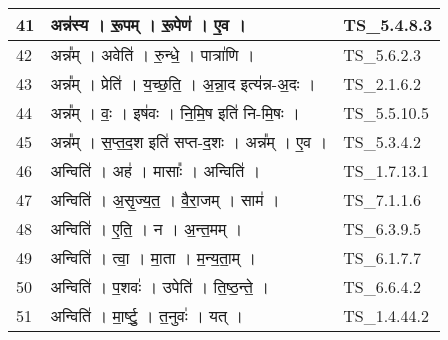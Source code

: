 \documentclass[17pt]{extarticle}
\begin{document}
\begin{longtable}{||p{0.4in}||p{4.9in}||p{0.9in}||}
    \hline
        
    41 & अन्न॑स्य   ।   रू॒पम्   ।   रू॒पेण॑   ।   ए॒व   ।    & TS\_5.4.8.3       \\
    
    \hline
        
    42 & अन्न᳚म्   ।   अवेति॑   ।   रु॒न्धे॒   ।   पात्रा॑णि   ।    & TS\_5.6.2.3       \\
    
    \hline
        
    43 & अन्न᳚म्   ।   प्रेति॑   ।   य॒च्छ॒ति॒   ।   अ॒न्ना॒द इत्य॑न्न{-}अ॒दः   ।    & TS\_2.1.6.2       \\
    
    \hline
        
    44 & अन्न᳚म्   ।   वः॒   ।   इष॑वः   ।   नि॒मि॒ष इति॑ नि{-}मि॒षः   ।    & TS\_5.5.10.5       \\
    
    \hline
        
    45 & अन्न᳚म्   ।   स॒प्त॒द॒श इति॑ सप्त{-}द॒शः   ।   अन्न᳚म्   ।   ए॒व   ।    & TS\_5.3.4.2       \\
    
    \hline
        
    46 & अन्विति॑   ।   अह॑   ।   मासाः᳚   ।   अन्विति॑   ।    & TS\_1.7.13.1       \\
    
    \hline
        
    47 & अन्विति॑   ।   अ॒सृ॒ज्य॒त॒   ।   वै॒रा॒जम्   ।   साम॑   ।    & TS\_7.1.1.6       \\
    
    \hline
        
    48 & अन्विति॑   ।   ए॒ति॒   ।   न   ।   अ॒न्त॒मम्   ।    & TS\_6.3.9.5       \\
    
    \hline
        
    49 & अन्विति॑   ।   त्वा॒   ।   मा॒ता   ।   म॒न्य॒ता॒म्   ।    & TS\_6.1.7.7       \\
    
    \hline
        
    50 & अन्विति॑   ।   प॒शवः॑   ।   उपेति॑   ।   ति॒ष्ठ॒न्ते॒   ।    & TS\_6.6.4.2       \\
    
    \hline
        
    51 & अन्विति॑   ।   मा॒र्ष्टु॒   ।   त॒नुवः॑   ।   यत्   ।    & TS\_1.4.44.2       \\
    

\end{longtable}
\end{document}

